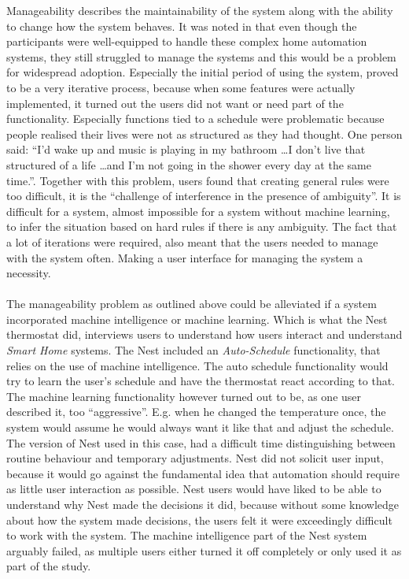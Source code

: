 Manageability describes the maintainability of the system along with the ability to change how the system behaves. It was noted in \cite{HAInterviews} that even though the participants were well-equipped to handle these complex home automation systems, they still struggled to manage the systems and this would be a problem for widespread adoption. Especially the initial period of using the system, proved to be a very iterative process, because when some features were actually implemented, it turned out the users did not want or need part of the functionality. Especially functions tied to a schedule were problematic because people realised their lives were not as structured as they had thought. One person said: \enquote{I'd wake up and music is playing in my bathroom \ldots I don't live that structured of a life \ldots and I'm not going in the shower every day at the same time.}. Together with this problem, users found that creating general rules were too difficult, it is the \enquote{challenge of interference in the presence of ambiguity}\cite{HAInterviews}. It is difficult for a system, almost impossible for a system without machine learning, to infer the situation based on hard rules if there is any ambiguity. The fact that a lot of iterations were required, also meant that the users needed to manage with the system often. Making a user interface for managing the system a necessity.
\\\\
The manageability problem as outlined above could be alleviated if a system incorporated machine intelligence or machine learning. Which is what the Nest thermostat did, \cite{AdaptiveInterviews} interviews users to understand how users interact and understand \emph{Smart Home} systems. The Nest included an \emph{Auto-Schedule} functionality, that relies on the use of machine intelligence. The auto schedule functionality would try to learn the user's schedule and have the thermostat react according to that. The machine learning functionality however turned out to be, as one user described it\cite{AdaptiveInterviews}, too \enquote{aggressive}. E.g. when he changed the temperature once, the system would assume he would always want it like that and adjust the schedule. The version of Nest used in this case, had a difficult time distinguishing between routine behaviour and temporary adjustments. Nest did not solicit user input, because it would go against the fundamental idea that automation should require as little user interaction as possible. Nest users would have liked to be able to understand why Nest made the decisions it did, because without some knowledge about how the system made decisions, the users felt it were exceedingly difficult to work with the system. The machine intelligence part of the Nest system\cite{AdaptiveInterviews} arguably failed, as multiple users either turned it off completely or only used it as part of the study.

